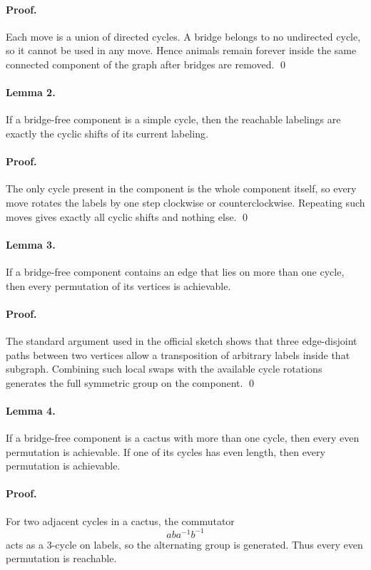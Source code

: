 \documentclass[11pt]{article}
\begin{document}
\paragraph{Proof.}
Each move is a union of directed cycles. A bridge belongs to no undirected cycle, so it cannot be used in
any move. Hence animals remain forever inside the same connected component of the graph after bridges
are removed. \qed

\paragraph{Lemma 2.}
If a bridge-free component is a simple cycle, then the reachable labelings are exactly the cyclic shifts of
its current labeling.

\paragraph{Proof.}
The only cycle present in the component is the whole component itself, so every move rotates the labels by
one step clockwise or counterclockwise. Repeating such moves gives exactly all cyclic shifts and nothing
else. \qed

\paragraph{Lemma 3.}
If a bridge-free component contains an edge that lies on more than one cycle, then every permutation of
its vertices is achievable.

\paragraph{Proof.}
The standard argument used in the official sketch shows that three edge-disjoint paths between two
vertices allow a transposition of arbitrary labels inside that subgraph. Combining such local swaps with the
available cycle rotations generates the full symmetric group on the component. \qed

\paragraph{Lemma 4.}
If a bridge-free component is a cactus with more than one cycle, then every even permutation is
achievable. If one of its cycles has even length, then every permutation is achievable.

\paragraph{Proof.}
For two adjacent cycles in a cactus, the commutator
\[
aba^{-1}b^{-1}
\]
acts as a 3-cycle on labels, so the alternating group is generated. Thus every even permutation is
reachable.
\end{document}
